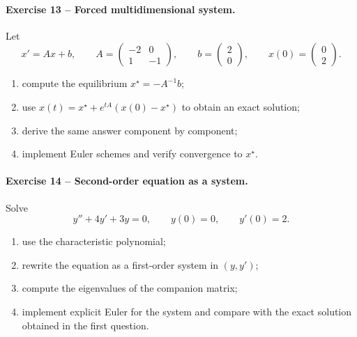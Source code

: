 \documentclass[10pt]{article}
\begin{document}
\paragraph{Exercise 13 -- Forced multidimensional system.}
Let
\[
x'=Ax+b,
\qquad
A=\begin{pmatrix}-2&0\\1&-1\end{pmatrix},
\qquad
b=\begin{pmatrix}2\\0\end{pmatrix},
\qquad x(0)=\begin{pmatrix}0\\2\end{pmatrix}.
\]
\begin{enumerate}
\item compute the equilibrium $x^\star=-A^{-1}b$;
\item use
$x(t)=x^\star+e^{tA}(x(0)-x^\star)$ to obtain an exact solution;
\item derive the same answer component by component;
\item implement Euler schemes and verify convergence to $x^\star$.
\end{enumerate}

\paragraph{Exercise 14 -- Second-order equation as a system.}
Solve
\[
y''+4y'+3y=0,
\qquad y(0)=0,
\qquad y'(0)=2.
\]
\begin{enumerate}
\item use the characteristic polynomial;
\item rewrite the equation as a first-order system in $(y,y')$;
\item compute the eigenvalues of the companion matrix;
\item implement explicit Euler for the system and compare with the exact
solution obtained in the first question.
\end{enumerate}
\end{document}
